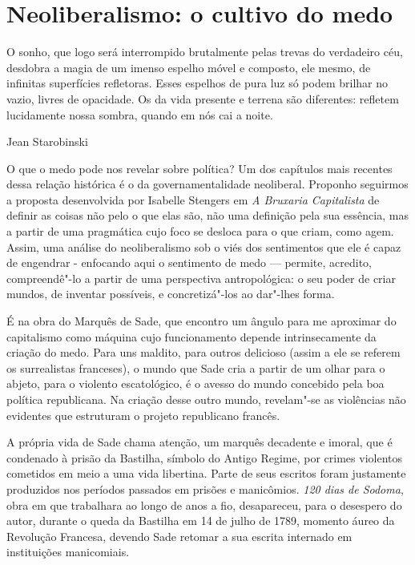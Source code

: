 \section{Neoliberalismo: o cultivo do medo}

\epigraph{O sonho, que logo será interrompido brutalmente pelas trevas do
verdadeiro céu, desdobra a magia de um imenso espelho móvel e composto,
ele mesmo, de infinitas superfícies refletoras. Esses espelhos de pura
luz só podem brilhar no vazio, livres de opacidade. Os da vida presente
e terrena são diferentes: refletem lucidamente nossa sombra, quando em
nós cai a noite.}{Jean Starobinski}

O que o medo pode nos revelar sobre política? Um dos capítulos mais
recentes dessa relação histórica é o da governamentalidade neoliberal.
Proponho seguirmos a proposta desenvolvida por Isabelle Stengers em
\emph{A Bruxaria Capitalista} de definir as coisas não pelo o que elas
são, não uma definição pela sua essência, mas a partir de uma pragmática
cujo foco se desloca para o que criam, como agem. Assim, uma análise do
neoliberalismo sob o viés dos sentimentos que ele é capaz de engendrar -
enfocando aqui o sentimento de medo --- permite, acredito, compreendê"-lo a
partir de uma perspectiva antropológica: o seu poder de criar mundos, de
inventar possíveis, e concretizá"-los ao dar"-lhes forma.

\asterisc

É na obra do Marquês de Sade, que encontro um ângulo para me aproximar
do capitalismo como máquina cujo funcionamento depende intrinsecamente
da criação do medo. Para uns maldito, para outros delicioso (assim a ele
se referem os surrealistas franceses), o mundo que Sade cria a partir de
um olhar para o abjeto, para o violento escatológico, é o avesso do
mundo concebido pela boa política republicana. Na criação desse outro
mundo, revelam"-se as violências não evidentes que estruturam o projeto
republicano francês.

A própria vida de Sade chama atenção, um marquês decadente e imoral, que
é condenado à prisão da Bastilha, símbolo do Antigo Regime, por crimes
violentos cometidos em meio a uma vida libertina. Parte de seus escritos
foram justamente produzidos nos períodos passados em prisões e
manicômios. \emph{120 dias de Sodoma}, obra em que trabalhara ao longo
de anos a fio, desapareceu, para o desespero do autor, durante o queda
da Bastilha em 14 de julho de 1789, momento áureo da Revolução Francesa,
devendo Sade retomar a sua escrita internado em instituições
manicomiais.

